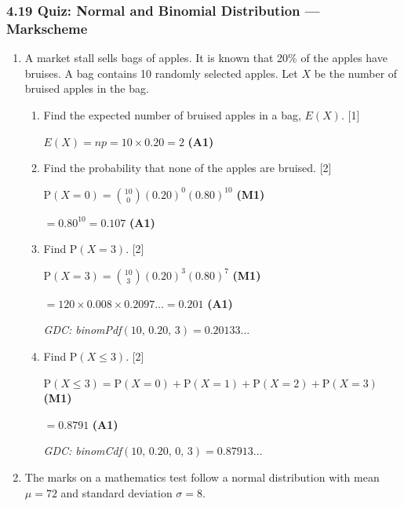 \documentclass[12pt, twoside]{article}
\begin{document}
\subsubsection*{4.19 Quiz: Normal and Binomial Distribution --- Markscheme}

\begin{enumerate}[itemsep=0.15cm]

\item A market stall sells bags of apples. It is known that 20\% of the apples
      have bruises. A bag contains 10 randomly selected apples.
      Let $X$ be the number of bruised apples in the bag.

\begin{enumerate}[itemsep=0.3cm]
  \item Find the expected number of bruised apples in a bag, $E(X)$. \hfill [1]

  $E(X) = np = 10 \times 0.20 = 2$ \hfill \textbf{(A1)}

  \item Find the probability that none of the apples are bruised. \hfill [2]

  $\mathrm{P}(X = 0) = \binom{10}{0}(0.20)^{0}(0.80)^{10}$ \hfill \textbf{(M1)}

  $= 0.80^{10} = 0.107$ \hfill \textbf{(A1)}

  \item Find $\mathrm{P}(X = 3)$. \hfill [2]

  $\mathrm{P}(X = 3) = \binom{10}{3}(0.20)^{3}(0.80)^{7}$ \hfill \textbf{(M1)}

  $= 120 \times 0.008 \times 0.2097\ldots = 0.201$ \hfill \textbf{(A1)}

  \emph{GDC: binomPdf$(10,\, 0.20,\, 3) = 0.20133\ldots$}

  \item Find $\mathrm{P}(X \leq 3)$. \hfill [2]

  $\mathrm{P}(X \leq 3) = \mathrm{P}(X=0) + \mathrm{P}(X=1) + \mathrm{P}(X=2) + \mathrm{P}(X=3)$ \hfill \textbf{(M1)}

  $= 0.8791$ \hfill \textbf{(A1)}

  \emph{GDC: binomCdf$(10,\, 0.20,\, 0,\, 3) = 0.87913\ldots$}
\end{enumerate}

\newpage

\item The marks on a mathematics test follow a normal distribution
      with mean $\mu = 72$ and standard deviation $\sigma = 8$.


\end{enumerate}
\end{document}
